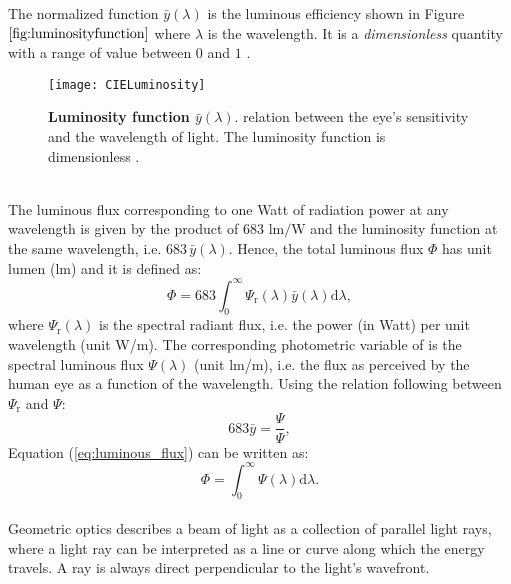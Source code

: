   The normalized function $\bar{y}(\lambda)$ is the luminous efficiency shown in Figure $\ref{fig:luminosityfunction}$ where $\lambda$ is the wavelength. It is a \textit{dimensionless} quantity with a range of value between $0$ and $1$ \cite{schubert2005light}.
\begin{figure}[h]
  \begin{center}
  \texttt{[image: CIELuminosity]}
  \end{center}
  \caption{\textbf{Luminosity function $\bar{y}(\lambda)$}. relation between the eye's sensitivity and the wavelength of light. The luminosity function is dimensionless  \cite{wiki}.}
  \label{fig:luminosityfunction}
  \end{figure}
\\ \indent The luminous flux corresponding to one Watt of radiation power at any wavelength is given by the product of $683$ $\textrm{lm/W}$ and the luminosity function at the same wavelength,
i.e. $683 \, \bar{y}(\lambda)$. Hence, the total luminous flux $\Phi$ has unit lumen (\textrm{lm}) and it is defined as:
\begin{equation}\label{eq:luminous_flux}
\Phi = 683 \int_0^\infty \Psi_\textrm{r}(\lambda) \bar{y}(\lambda)\textrm{d}\lambda,
\end{equation}
where $\Psi_\textrm{r}(\lambda)$ is the spectral radiant flux, i.e. the power (in Watt) per unit wavelength (unit \textrm{W}/\textrm{m}). The corresponding photometric variable of is the spectral luminous flux $\Psi(\lambda)$ (unit \textrm{lm}/\textrm{m}), i.e. the flux as perceived by the human eye as a function of the wavelength. 
Using the relation following between $\Psi_\textrm{r}$ and $\Psi$:
\begin{equation}
683 \bar{y} = \frac{\Psi}{\Psi}, 
\end{equation}
Equation (\ref{eq:luminous_flux}) can be written as:
\begin{equation}
\Phi = \int_0^\infty \Psi(\lambda)\textrm{d}\lambda.
\end{equation}
\\ \indent Geometric optics describes a beam of light as a collection of parallel light rays, where a light ray can be interpreted as a line or curve along which the energy travels. A ray is always direct perpendicular to the light's wavefront.  
